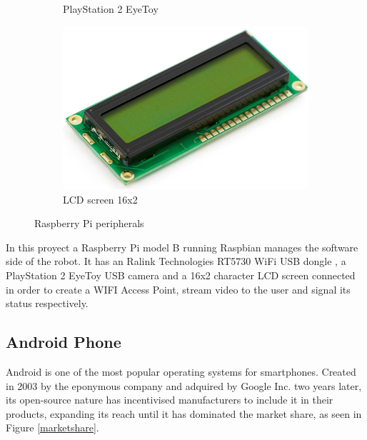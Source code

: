\begin{figure}[H]
\begin{subfigure}[b]{0.3\textwidth}
				\caption{PlayStation 2 EyeToy }
		        \label{}
		    \end{subfigure}
		    \hfill
		    \begin{subfigure}[b]{0.3\textwidth}
		        \centering
		      	\includegraphics[scale=0.25]{images/ProjectComponents/lcd.jpg}
				\caption{LCD screen 16x2}
		        \label{}
		    \end{subfigure}
		    \caption{Raspberry Pi peripherals}
		    \label{}
		\end{figure}


	In this proyect a Raspberry Pi model B running Raspbian manages the software side of the robot. It has an Ralink Technologies RT5730 WiFi USB dongle , a PlayStation 2 EyeToy USB camera and a 16x2 character LCD screen connected in order to create a WIFI Access Point, stream video to the user and signal its status respectively.






\newpage
\subsection{Android Phone}

Android is one of the most popular operating systems for smartphones. Created in 2003 by the eponymous company and adquired by Google Inc. two years later, its open-source nature has incentivised manufacturers to include it in their products, expanding its reach until it has dominated the market share, as seen in Figure \ref{marketshare}.

